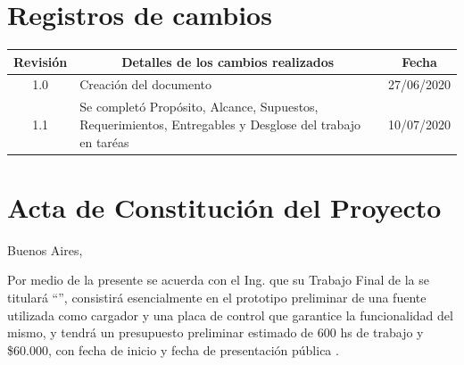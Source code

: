 \documentclass[11pt]{charter}
\begin{document}
\maketitle
\thispagestyle{empty}
\pagebreak


\thispagestyle{empty}
{\setlength{\parskip}{0pt}
\tableofcontents{}
}
\pagebreak


\section{Registros de cambios}
\label{sec:registro}


\begin{table}[ht]
\label{tab:registro}
\centering

\begin{tabularx}{\linewidth}{@{}|c|X|c|@{}}
\hline
\rowcolor[HTML]{C0C0C0} 
Revisión & \multicolumn{1}{c|}{\cellcolor[HTML]{C0C0C0}Detalles de los cambios realizados} & Fecha      \\ \hline
1.0      & Creación del documento                                                          & 27/06/2020 \\ \hline
1.1      & Se completó Propósito, Alcance, Supuestos, Requerimientos, Entregables y Desglose del trabajo en taréas 																						   & 10/07/2020 \\ \hline
\end{tabularx}
\end{table}

\pagebreak



\section{Acta de Constitución del Proyecto}
\label{sec:acta}

\begin{flushright}
Buenos Aires, \fechaInicioName
\end{flushright}

\vspace{2cm}

Por medio de la presente se acuerda con el Ing. \authorname\hspace{1px} que su Trabajo Final de la \degreename\hspace{1px} se titulará ``\ttitle'', consistirá esencialmente en el prototipo preliminar de una fuente utilizada como cargador y una placa de control que garantice la funcionalidad del mismo, y tendrá un presupuesto preliminar estimado de 600 hs de trabajo y {\$60.000}, con fecha de inicio \fechaInicioName\hspace{1px} y fecha de presentación pública \fechaFinalName.
\end{document}
